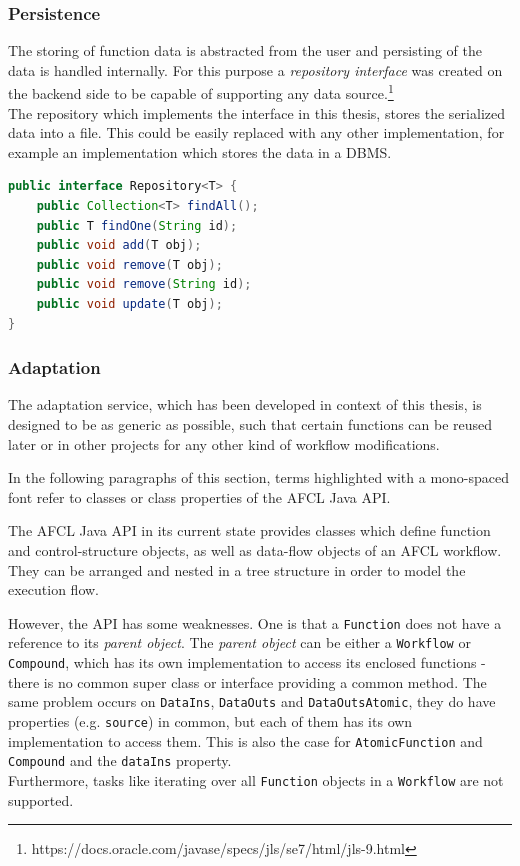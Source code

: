 \documentclass[a4paper,12pt,pdftex,halfparskip,cleardoubleempty,bibtotoc,liststotoc]{scrbook}
\begin{document}
\subsubsection{Persistence}
\label{sec:backend-persistence}

The storing of function data is abstracted from the user and persisting of the data is handled internally. For this purpose a \textit{repository interface} was created on the backend side to be capable of supporting any data source.\footnote{https://docs.oracle.com/javase/specs/jls/se7/html/jls-9.html}\\
The repository which implements the interface in this thesis, stores the serialized data into a file. This could be easily replaced with any other implementation, for example an implementation which stores the data in a DBMS.


\begin{lstlisting}[language=Java, caption=Repository Interface]
public interface Repository<T> {
    public Collection<T> findAll();
    public T findOne(String id);
    public void add(T obj);
    public void remove(T obj);
    public void remove(String id);
    public void update(T obj);
}
\end{lstlisting}

\subsubsection{Adaptation}
The adaptation service, which has been developed in context of this thesis, is designed to be as generic as possible, such that certain functions can be reused later or in other projects for any other kind of workflow modifications.

In the following paragraphs of this section, terms highlighted with a mono-spaced font refer to classes or class properties of the AFCL Java API.

The AFCL Java API in its current state provides classes which define function and control-structure objects, as well as data-flow objects of an AFCL workflow. They can be arranged and nested in a tree structure in order to model the execution flow.

However, the API has some weaknesses. One is that a \texttt{Function} does not have a reference to its \textit{parent object}. The \textit{parent object} can be either a \texttt{Workflow} or \texttt{Compound}, which has its own implementation to access its enclosed functions - there is no common super class or interface providing a common method. The same problem occurs on \texttt{DataIns}, \texttt{DataOuts} and \texttt{DataOutsAtomic}, they do have properties (e.g. \texttt{source}) in common, but each of them has its own implementation to access them. This is also the case for \texttt{AtomicFunction} and \texttt{Compound} and the \texttt{dataIns} property.\\
Furthermore, tasks like iterating over all \texttt{Function} objects in a \texttt{Workflow} are not supported. 
\end{document}
